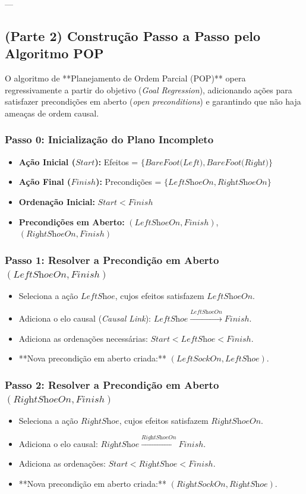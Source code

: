 \documentclass[a4paper,12pt]{article}
\begin{document}
---

\subsection*{(Parte 2) Construção Passo a Passo pelo Algoritmo POP}

O algoritmo de **Planejamento de Ordem Parcial (POP)** opera regressivamente a partir do objetivo (\textit{Goal Regression}), adicionando ações para satisfazer precondições em aberto (\textit{open preconditions}) e garantindo que não haja ameaças de ordem causal.

\subsubsection*{Passo 0: Inicialização do Plano Incompleto}
\begin{itemize}
	\item \textbf{Ação Inicial ($Start$):} Efeitos = $\{\textit{BareFoot(Left)}, \textit{BareFoot(Right)}\}$
	\item \textbf{Ação Final ($Finish$):} Precondições = $\{\textit{LeftShoeOn}, \textit{RightShoeOn}\}$
	\item \textbf{Ordenação Inicial:} $Start < Finish$
	\item \textbf{Precondições em Aberto:} $(\textit{LeftShoeOn}, Finish)$, $(\textit{RightShoeOn}, Finish)$
\end{itemize}

\subsubsection*{Passo 1: Resolver a Precondição em Aberto $(\textit{LeftShoeOn}, Finish)$}
\begin{itemize}
	\item Seleciona a ação $\textit{LeftShoe}$, cujos efeitos satisfazem $\textit{LeftShoeOn}$.
	\item Adiciona o elo causal (\textit{Causal Link}): $\textit{LeftShoe} \xrightarrow{\textit{LeftShoeOn}} Finish$.
	\item Adiciona as ordenações necessárias: $Start < \textit{LeftShoe} < Finish$.
	\item **Nova precondição em aberto criada:** $(\textit{LeftSockOn}, \textit{LeftShoe})$.
\end{itemize}

\subsubsection*{Passo 2: Resolver a Precondição em Aberto $(\textit{RightShoeOn}, Finish)$}
\begin{itemize}
	\item Seleciona a ação $\textit{RightShoe}$, cujos efeitos satisfazem $\textit{RightShoeOn}$.
	\item Adiciona o elo causal: $\textit{RightShoe} \xrightarrow{\textit{RightShoeOn}} Finish$.
	\item Adiciona as ordenações: $Start < \textit{RightShoe} < Finish$.
	\item **Nova precondição em aberto criada:** $(\textit{RightSockOn}, \textit{RightShoe})$.
\end{itemize}
\end{document}
